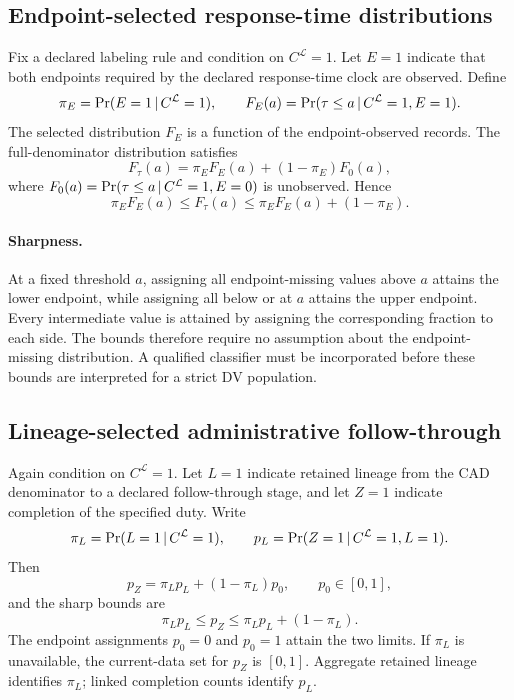 \documentclass[11pt]{article}
\begin{document}
\subsection{Endpoint-selected response-time distributions}
\label{sec:response_bounds_appendix}

Fix a declared labeling rule and condition on $C^{\mathcal L}=1$. Let $E=1$ indicate that both endpoints required by the declared response-time clock are observed. Define
\begin{equation}
\pi_E=\Pr(E=1\,|\, C^{\mathcal L}=1),
\qquad
F_E(a)=\Pr(\tau\le a\,|\, C^{\mathcal L}=1,E=1).
\end{equation}
The selected distribution $F_E$ is a function of the endpoint-observed records. The full-denominator distribution satisfies
\begin{equation}
F_\tau(a)
=\pi_EF_E(a)+(1-\pi_E)F_0(a),
\label{eq:response_mixture_appendix}
\end{equation}
where $F_0(a)=\Pr(\tau\le a\,|\, C^{\mathcal L}=1,E=0)$ is unobserved. Hence
\begin{equation}
\pi_EF_E(a)
\le F_\tau(a)\le
\pi_EF_E(a)+(1-\pi_E).
\label{eq:response_bound_appendix}
\end{equation}

\paragraph{Sharpness.}
At a fixed threshold $a$, assigning all endpoint-missing values above $a$ attains the lower endpoint, while assigning all below or at $a$ attains the upper endpoint. Every intermediate value is attained by assigning the corresponding fraction to each side. The bounds therefore require no assumption about the endpoint-missing distribution. A qualified classifier must be incorporated before these bounds are interpreted for a strict DV population.

\subsection{Lineage-selected administrative follow-through}
\label{sec:follow_bounds_appendix}

Again condition on $C^{\mathcal L}=1$. Let $L=1$ indicate retained lineage from the CAD denominator to a declared follow-through stage, and let $Z=1$ indicate completion of the specified duty. Write
\begin{equation}
\pi_L=\Pr(L=1\,|\, C^{\mathcal L}=1),
\qquad
p_L=\Pr(Z=1\,|\, C^{\mathcal L}=1,L=1).
\end{equation}
Then
\begin{equation}
p_Z
=\pi_Lp_L+(1-\pi_L)p_0,
\qquad p_0\in[0,1],
\end{equation}
and the sharp bounds are
\begin{equation}
\pi_Lp_L
\le p_Z\le
\pi_Lp_L+(1-\pi_L).
\label{eq:follow_bound_appendix}
\end{equation}
The endpoint assignments $p_0=0$ and $p_0=1$ attain the two limits. If $\pi_L$ is unavailable, the current-data set for $p_Z$ is $[0,1]$. Aggregate retained lineage identifies $\pi_L$; linked completion counts identify $p_L$.
\end{document}
